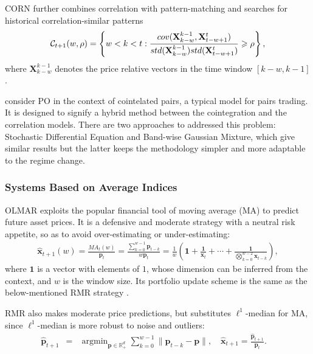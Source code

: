 \documentclass[twoside,11pt]{article}
\DeclareMathOperator*{\argmin}{argmin}
\begin{document}
CORN \citep{CORN} further combines correlation with pattern-matching \citep{multpliupdate} and searches for historical correlation-similar patterns 
\begin{eqnarray*}
\mathcal{C}_{t+1}(w,\rho)=\left\{w<k<t: \frac{cov(\mathbf{X}_{k-w}^{k-1}, \mathbf{X}_{t-w+1}^{t})}{std(\mathbf{X}_{k-w}^{k-1})std(\mathbf{X}_{t-w+1}^{t})}\geqslant \rho    \right\},
\end{eqnarray*}
where $\mathbf{X}_{k-w}^{k-1}$ denotes the price relative vectors in the time window $[k-w,k-1]$.

\citet{cointel} consider PO in the context of cointelated pairs, a typical model for pairs trading. It is designed to signify a hybrid method between the cointegration and the correlation models. There are two approaches to addressed this problem: Stochastic Differential Equation and Band-wise Gaussian Mixture, which give similar results but the latter keeps the methodology simpler and more adaptable to the regime change.



\subsubsection{Systems Based on Average Indices}
\label{sec:aversystem}
OLMAR \citep{OLMAR} exploits the popular financial tool of moving average (MA) to predict future asset prices. It is a defensive and moderate strategy with a neutral risk appetite, so as to avoid over-estimating or under-estimating:
\begin{eqnarray}
\label{eqn:sma}
\hat{\mathbf{x}}_{t+1}(w) =\frac{MA_t(w)}{\mathbf{p}_{t}}=\frac{\sum_{k=0}^{w-1}\mathbf{p}_{t-k}}{w\mathbf{p}_{t}} =\frac{1}{w}\left(  \mathbf{1}+ \frac{\mathbf{1}}{\mathbf{x}_{t}}+\cdots+\frac{\mathbf{1}}{\bigotimes_{k=0}^{w-2}\mathbf{x}_{t-k}} \right),
\end{eqnarray}
where $\mathbf{1}$ is a vector with elements of $1$, whose dimension can be inferred from the context, and $w$ is the window size. Its portfolio update scheme is the same as the below-mentioned RMR strategy \citep{RMR2}.

RMR also makes moderate price predictions, but substitutes $\ell^1$-median \citep{l1median3} for MA, since $\ell^1$-median is more robust to noise and outliers:
\begin{eqnarray}
\label{eqn:l1median}
\hat{\mathbf{p}}_{t+1}&=&\argmin_{\mathbf{p}\in \mathbb{R}_+^d}\sum_{k=0}^{w-1}\|\mathbf{p}_{t-k}-\mathbf{p}\|, \quad\hat{\mathbf{x}}_{t+1}=\frac{\hat{\mathbf{p}}_{t+1}}{\mathbf{p}_{t}}.\quad
\end{eqnarray}
\end{document}
